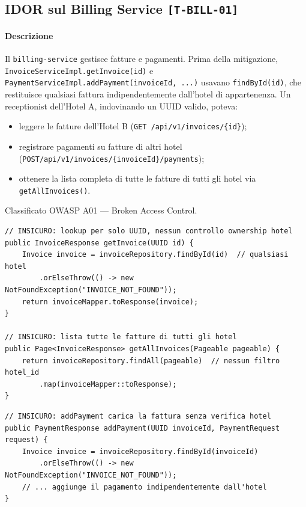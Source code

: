 ﻿\documentclass[a4paper,12pt]{report}
\newcommand{\threat}[1]{\texttt{\small\textcolor{vulnred}{[#1]}}}
\begin{document}
\subsection{IDOR sul Billing Service \threat{T-BILL-01}}

\paragraph{Descrizione}
Il \texttt{billing-service} gestisce fatture e pagamenti. Prima della mitigazione,
\texttt{InvoiceServiceImpl.getInvoice(id)} e \texttt{PaymentServiceImpl.addPayment(invoiceId, ...)}
usavano \texttt{findById(id)}, che restituisce qualsiasi fattura indipendentemente dall'hotel
di appartenenza. Un receptionist dell'Hotel A, indovinando un UUID valido, poteva:
\begin{itemize}
  \item leggere le fatture dell'Hotel B (\texttt{GET /api/v1/invoices/\{id\}});
  \item registrare pagamenti su fatture di altri hotel (\texttt{POST}\linebreak\texttt{/api/v1/invoices/\{invoiceId\}/payments});
  \item ottenere la lista completa di tutte le fatture di tutti gli hotel via \texttt{getAllInvoices()}.
\end{itemize}
Classificato OWASP A01 --- Broken Access Control.

\begin{insecurebox}[title={Codice Vulnerabile --- InvoiceServiceImpl.java (baseline)}]
\begin{lstlisting}[style=java]
// INSICURO: lookup per solo UUID, nessun controllo ownership hotel
public InvoiceResponse getInvoice(UUID id) {
    Invoice invoice = invoiceRepository.findById(id)  // qualsiasi hotel
        .orElseThrow(() -> new NotFoundException("INVOICE_NOT_FOUND"));
    return invoiceMapper.toResponse(invoice);
}

// INSICURO: lista tutte le fatture di tutti gli hotel
public Page<InvoiceResponse> getAllInvoices(Pageable pageable) {
    return invoiceRepository.findAll(pageable)  // nessun filtro hotel_id
        .map(invoiceMapper::toResponse);
}
\end{lstlisting}
\end{insecurebox}

\begin{insecurebox}[title={Codice Vulnerabile --- PaymentServiceImpl.java (baseline)}]
\begin{lstlisting}[style=java]
// INSICURO: addPayment carica la fattura senza verifica hotel
public PaymentResponse addPayment(UUID invoiceId, PaymentRequest request) {
    Invoice invoice = invoiceRepository.findById(invoiceId)
        .orElseThrow(() -> new NotFoundException("INVOICE_NOT_FOUND"));
    // ... aggiunge il pagamento indipendentemente dall'hotel
}
\end{lstlisting}
\end{insecurebox}
\end{document}
